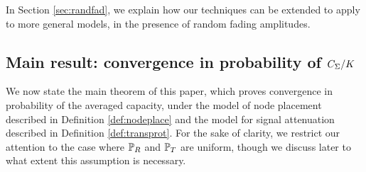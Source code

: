 \documentclass[journal]{IEEEtran}
\begin{document}
In Section \ref{sec:randfad}, we explain how our techniques can be
 extended to apply to more general models, in the presence of random fading 
amplitudes.
%
\subsection{Main result: convergence in probability of $C_{\Sigma}/K$}
%
We now state the main theorem of this paper, which proves convergence in
probability of the averaged capacity, under the model of node placement
described in Definition \ref{def:nodeplace}  and 
the model for signal attenuation described in Definition
\ref{def:transprot}. For the sake of clarity, we restrict our attention to the
case where ${\mathbb {P}}_R$ and ${\mathbb {P}}_T$ are uniform, though we
discuss later to what extent this assumption is necessary. 
\end{document}
